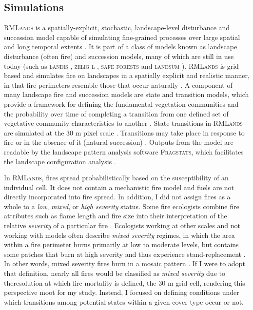 \subsection*{Simulations}

\textsc{RMLands} is a spatially-explicit, stochastic, landscape-level disturbance and succession model capable of simulating fine-grained processes over large spatial and long temporal extents \citep{McGarigal2005}. It is part of a class of models known as landscape disturbance (often fire) and succession models, many of which are still in use today (such as \textsc{landis} \citep{He1999}, \textsc{zelig-l} \citep{Miller1999}, \textsc{safe-forests} \cite{Sessions1997} and \textsc{landsum} \citep{Keane2012}). \textsc{RMLands} is grid-based and simulates fire on landscapes in a spatially explicit and realistic manner, in that fire perimeters resemble those that occur naturally \citep{McGarigal2005a,McGarigal2005}. A component of many landscape fire and succession models are state and transition models, which provide a framework for defining the fundamental vegetation communities and the probability over time of completing a transition from one defined set of vegetative community characteristics to another \citep{Stringham2003,Blankenship2015}. State transitions in \textsc{RMLands} are simulated at the 30 m pixel scale \citep{Cushman2011}. Transitions may take place in response to fire or in the absence of it (natural succession) \citep{McGarigal2012}. Outputs from the model are readable by the landscape pattern analysis software \textsc{Fragstats}, which facilitates the landscape configuration analysis \citep{Fragstats2012}.

In \textsc{RMLands}, fires spread probabilistically based on the susceptibility of an individual cell. It does not contain a mechanistic fire model and fuels are not directly incorporated into fire spread. In addition, I did not assign fires as a whole to a \emph{low}, \emph{mixed}, or \emph{high severity} status. Some fire ecologists combine fire attributes such as flame length and fire size into their interpretation of the relative \emph{severity} of a particular fire \citep{Agee1993}. Ecologists working at other scales and not working with models often describe \emph{mixed severity} regimes, in which the area within a fire perimeter burns primarily at low to moderate levels, but contains some patches that burn at high severity and thus experience stand-replacement \citep{Collins2010,Kane2013}. In other words, mixed severity fires burn in a mosaic pattern \citep{Beaty2001}. If I were to adopt that definition, nearly all fires would be classified as \emph{mixed severity} due to theresolution at which fire mortality is defined, the 30 m grid cell, rendering this perspective moot for my study. Instead, I focused on defining conditions under which transitions among potential states within a given cover type occur or not. 

